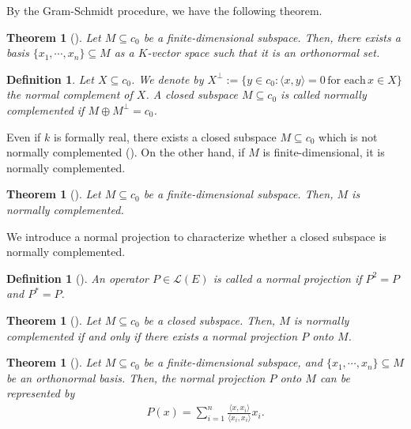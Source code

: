 \documentclass[12pt]{amsart}
\theoremstyle{plain}
\newtheorem{thm}[prop] {Theorem}
\newtheorem{dfn} [prop]{Definition}
\theoremstyle{definition}
\begin{document}
By the Gram-Schmidt procedure, we have the following theorem.

\begin{thm}[{\cite[Section 7]{inner}}]
  Let $M \subseteq c_0$ be a finite-dimensional subspace. Then, there exists a basis $\{x_1, \cdots, x_n\} \subseteq M$ as a $K$-vector space such that it is an orthonormal set.
\end{thm}

\begin{dfn}
  Let $X \subseteq c_0$. We denote by $X^{\perp} := \{y \in c_0 : \langle x, y \rangle = 0 \, \text{for each} \, x \in X\}$ the normal complement of $X$. A closed subspace $M \subseteq c_0$ is called normally complemented if $M \oplus M^{\perp} = c_0$.
\end{dfn}

Even if $k$ is formally real, there exists a closed subspace $M \subseteq c_0$ which is not normally complemented (\cite[Remark 9.1]{inner}). On the other hand, if $M$ is finite-dimensional, it is normally complemented.

\begin{thm}[{\cite[Corollary 8.2]{inner}}]
  Let $M \subseteq c_0$ be a finite-dimensional subspace. Then, $M$ is normally complemented.
\end{thm}

We introduce a normal projection to characterize whether a closed subspace is normally complemented.

\begin{dfn}[{\cite[Definition 6]{hil}}]
  An operator $P \in \mathcal{L}(E)$ is called a normal projection if $P^2 = P$ and $P^* = P$. 
\end{dfn}

\begin{thm}[{\cite[Corollary 3]{hil}}]
  Let $M \subseteq c_0$ be a closed subspace. Then, $M$ is normally complemented if and only if there exists a normal projection $P$ onto $M$.
\end{thm}

\begin{thm}[{\cite[Theorem 8.1]{inner}}] \label{c3}
  Let $M \subseteq c_0$ be a finite-dimensional subspace, and $\{x_1, \cdots, x_n\} \subseteq M$ be an orthonormal basis. Then, the normal projection $P$ onto $M$ can be represented by
  \begin{align*}
    P(x) = \sum_{i=1}^n \frac{\langle x, x_i \rangle}{\langle x_i, x_i \rangle} x_i.
  \end{align*}
\end{thm}
\end{document}
